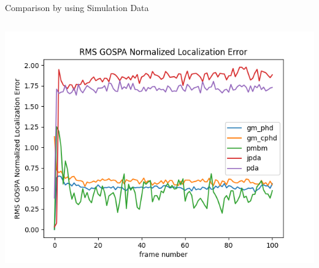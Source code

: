 \documentclass[12pt]{beamer}
\begin{document}
\begin{frame}{Comparison by using Simulation Data}
\begin{columns}[t]
\begin{column}{0.5\linewidth}
      \includegraphics[width=\linewidth,height=\textheight,keepaspectratio]{real_data/scenario1/gospa_localization.png}\\
  \end{column}
\end{columns}
\end{frame}
\end{document}
